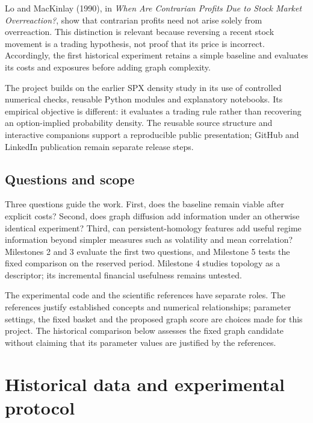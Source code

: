 \documentclass[12pt,a4paper,oneside]{article}
\newcommand{\bodyheading}[1]{\clearpage\section{#1}}
\begin{document}
Lo and MacKinlay (1990), in \textit{When Are Contrarian Profits Due to Stock Market Overreaction?}, show that contrarian profits need not arise solely from overreaction. This distinction is relevant because reversing a recent stock movement is a trading hypothesis, not proof that its price is incorrect. Accordingly, the first historical experiment retains a simple baseline and evaluates its costs and exposures before adding graph complexity.


The project builds on the earlier SPX density study in its use of controlled numerical checks, reusable Python modules and explanatory notebooks. Its empirical objective is different: it evaluates a trading rule rather than recovering an option-implied probability density. The reusable source structure and interactive companions support a reproducible public presentation; GitHub and LinkedIn publication remain separate release steps.


\subsection{Questions and scope}

Three questions guide the work. First, does the baseline remain viable after explicit costs? Second, does graph diffusion add information under an otherwise identical experiment? Third, can persistent-homology features add useful regime information beyond simpler measures such as volatility and mean correlation? Milestones 2 and 3 evaluate the first two questions, and Milestone 5 tests the fixed comparison on the reserved period. Milestone 4 studies topology as a descriptor; its incremental financial usefulness remains untested.


The experimental code and the scientific references have separate roles. The references justify established concepts and numerical relationships; parameter settings, the fixed basket and the proposed graph score are choices made for this project. The historical comparison below assesses the fixed graph candidate without claiming that its parameter values are justified by the references.


\bodyheading{Historical data and experimental protocol}
\end{document}
